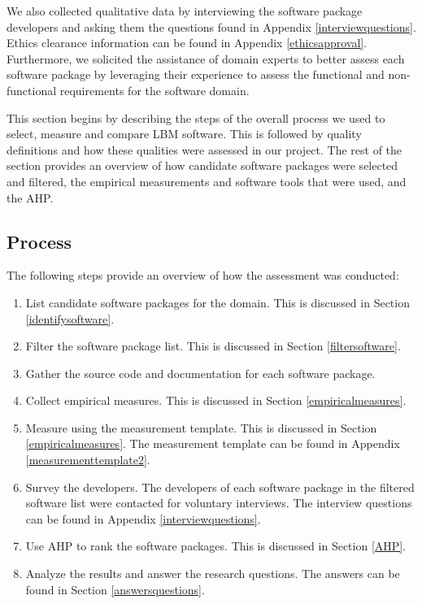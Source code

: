 \documentclass[12pt, notitlepage]{article}
\begin{document}
We also collected qualitative data by interviewing the software package developers and asking them the questions found in Appendix \ref{interviewquestions}. Ethics clearance information can be found in Appendix \ref{ethicsapproval}. Furthermore, we solicited the assistance of domain experts to better assess each software package by leveraging their experience to assess the functional and non-functional requirements for the software domain. 

This section begins by describing the steps of the overall process we used to select, measure and compare LBM software. This is followed by quality definitions and how these qualities were assessed in our project. The rest of the section provides an overview of how candidate software packages were selected and filtered, the empirical measurements and software tools that were used, and the AHP. 

\subsection{Process}

 The following steps provide an overview of how the assessment was conducted: 

\begin{enumerate}
	\item List candidate software packages for the domain. This is discussed in Section \ref{identifysoftware}.
	\item Filter the software package list. This is discussed in Section \ref{filtersoftware}.
	\item Gather the source code and documentation for each software package.
	\item Collect empirical measures. This is discussed in Section \ref{empiricalmeasures}.
	\item Measure using the measurement template. This is discussed in Section \ref{empiricalmeasures}. The measurement template can be found in Appendix \ref{measurementtemplate2}.
	\item Survey the developers. The developers of each software package in the filtered software list were contacted for voluntary interviews. The interview questions can be found in Appendix \ref{interviewquestions}.
	\item Use AHP to rank the software packages. This is discussed in Section \ref{AHP}.
	\item Analyze the results and answer the research questions. The answers can be found in Section \ref{answersquestions}.
\end{enumerate}
\end{document}
